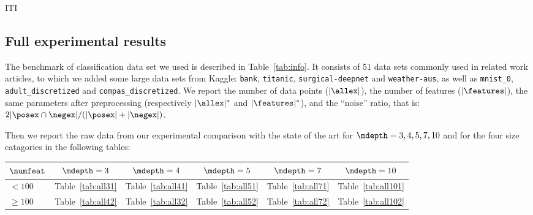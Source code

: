 \documentclass{article}
\begin{document}
\begin{table}[htbp]
\begin{center}
\begin{footnotesize}
\tabcolsep=10pt

\end{footnotesize}
\end{center}
\caption{\label{tab:iti} ITI}
\end{table}


\subsection{Full experimental results}


The benchmark of classification data set we used is described in Table~\ref{tab:info}. It consists of 51 data sets 
commonly used in related work articles, to which we added some large data sets from Kaggle: \texttt{bank}, \texttt{titanic}, \texttt{surgical-deepnet} and \texttt{weather-aus}, as well as \texttt{mnist\_0}, \texttt{adult\_discretized} and \texttt{compas\_discretized}. We report the number of data points ($|\allex|$), the number of features ($|\features|$), the same parameters after preprocessing (respectively $|\allex|^*$ and $|\features|^*$), and the ``noise'' ratio, that is: $2|\posex \cap \negex|/(|\posex|+|\negex|)$.

\medskip

Then we report the raw data from our experimental comparison with the state of the art for $\mdepth=3,4,5,7,10$ and for the four size catagories in the following tables:

\tabcolsep=10pt


\begin{center}
	\def\arraystretch{1.25}
\begin{tabular}{lccccc}
	\toprule
	$\numfeat$& $\mdepth = 3$ & $\mdepth = 4$ & $\mdepth = 5$ & $\mdepth = 7$ & $\mdepth = 10$ \\
	 \midrule
	$< 100$ & Table~\ref{tab:all31} & Table~\ref{tab:all41} & Table~\ref{tab:all51} & Table~\ref{tab:all71} & Table~\ref{tab:all101} \\
	$\geq 100$ & Table~\ref{tab:all42} & Table~\ref{tab:all32} & Table~\ref{tab:all52} & Table~\ref{tab:all72} & Table~\ref{tab:all102} \\
	\bottomrule 
\end{tabular}
\end{center}
\end{document}
